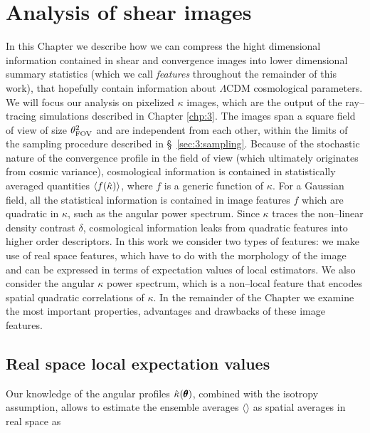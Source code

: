 
\chapter{Analysis of shear images}
\lhead[\fancyplain{}{\thepage}]{\fancyplain{}{\rightmark}}
 \thispagestyle{plain}
\setlength{\parindent}{10mm}

In this Chapter we describe how we can compress the hight dimensional information contained in shear and convergence images into lower dimensional summary statistics (which we call \textit{features} throughout the remainder of this work), that hopefully contain information about $\Lambda$CDM cosmological parameters. We will focus our analysis on pixelized $\kappa$ images, which are the output of the ray--tracing simulations described in Chapter \ref{chp:3}. The images span a square field of view of size $\theta_{\rm FOV}^2$ and are independent from each other, within the limits of the sampling procedure described in \S~\ref{sec:3:sampling}. Because of the stochastic nature of the convergence profile in the field of view (which ultimately originates from cosmic variance), cosmological information is contained in statistically averaged quantities $\langle f(\hat{\kappa})\rangle$, where $f$ is a generic function of $\kappa$. For a Gaussian field, all the statistical information is contained in image features $f$ which are quadratic in $\kappa$, such as the angular power spectrum. Since $\kappa$ traces the non--linear density contrast $\delta$, cosmological information leaks from quadratic features into higher order descriptors. In this work we consider two types of features: we make use of real space features, which have to do with the morphology of the image and can be expressed in terms of expectation values of local estimators. We also consider the angular $\kappa$ power spectrum, which is a non--local feature that encodes spatial quadratic correlations of $\kappa$. In the remainder of the Chapter we examine the most important properties, advantages and drawbacks of these image features. 

\section{Real space local expectation values}
Our knowledge of the angular profiles $\hat{\kappa}(\pmb{\theta})$, combined with the isotropy assumption, allows to estimate the ensemble averages $\langle\rangle$ as spatial averages in real space as 

